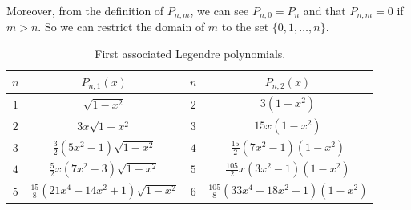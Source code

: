 \documentclass[../main.tex]{subfiles}
\begin{document}
Moreover, from the definition of $P_{n,m}$, we can see $P_{n,0}=P_n$ and that $P_{n,m}=0$ if $m>n$. So we can restrict the domain of $m$ to the set $\{0,1,\dots,n\}$.

\begin{table}[ht]
  \centering
  \captionsetup{type=table} %
  \begin{tabular}{c|c||c|c}
    $n$ & $P_{n,1}(x)$                              & $n$ & $P_{n,2}(x)$                          \\
    \hline
    $1$ & $\sqrt{1-x^2}$                            & $2$ & $3(1-x^2)$                            \\
    $2$ & $3x\sqrt{1-x^2}$                          & $3$ & $15x(1-x^2)$                          \\
    $3$ & $\frac{3}{2}(5 x^2-1)\sqrt{1-x^2}$        & $4$ & $\frac{15}{2}(7x^2-1)(1-x^2)$         \\
    $4$ & $\frac{5}{2}x(7x^2-3)\sqrt{1-x^2}$        & $5$ & $\frac{105}{2}x(3x^2-1)(1-x^2)$       \\
    $5$ & $\frac{15}{8}(21x^4-14x^2+1)\sqrt{1-x^2}$ & $6$ & $\frac{105}{8}(33x^4-18x^2+1)(1-x^2)$ \\
  \end{tabular}
  \caption{First associated Legendre polynomials.}
\end{table}
\end{document}

